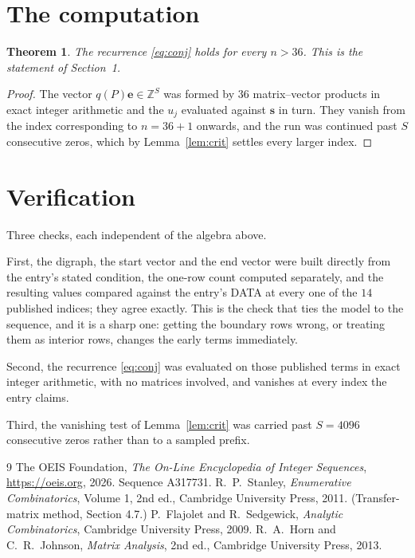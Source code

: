 \documentclass[11pt,a4paper]{article}
\theoremstyle{plain}
\newtheorem{theorem}{Theorem}
\theoremstyle{definition}
\begin{document}
\section{The computation}

\begin{theorem}
The recurrence \eqref{eq:conj} holds for every $n>36$. This is the statement of
Section~1.
\end{theorem}

\begin{proof}
The vector $q(P)\mathbf{e}\in\mathbb{Z}^{S}$ was formed by $36$ matrix--vector
products in exact integer arithmetic and the $u_j$ evaluated against $\mathbf{s}$ in turn.
They vanish from the index corresponding to $n=36+1$ onwards, and the run was continued
past $S$ consecutive zeros, which by Lemma~\ref{lem:crit} settles every larger index.
\end{proof}

\section{Verification}

Three checks, each independent of the algebra above.

First, the digraph, the start vector and the end vector were built directly from the
entry's stated condition, the one-row count computed separately, and the resulting values
compared against the entry's DATA at every one of the $14$ published indices; they
agree exactly. This is the check that ties the model to the sequence, and it is a sharp one:
getting the boundary rows wrong, or treating them as interior rows, changes the early terms
immediately.

Second, the recurrence \eqref{eq:conj} was evaluated on those published terms in exact
integer arithmetic, with no matrices involved, and vanishes at every index the entry claims.

Third, the vanishing test of Lemma~\ref{lem:crit} was carried past $S=4096$ consecutive
zeros rather than to a sampled prefix.

\begin{thebibliography}{9}
 The OEIS Foundation, \emph{The On-Line Encyclopedia of Integer
Sequences}, \url{https://oeis.org}, 2026. Sequence A317731.
 R.~P.~Stanley, \emph{Enumerative Combinatorics}, Volume 1, 2nd ed.,
Cambridge University Press, 2011. (Transfer-matrix method, Section 4.7.)
 P.~Flajolet and R.~Sedgewick, \emph{Analytic Combinatorics}, Cambridge
University Press, 2009.
 R.~A.~Horn and C.~R.~Johnson, \emph{Matrix Analysis}, 2nd ed., Cambridge
University Press, 2013.
\end{thebibliography}
\end{document}
